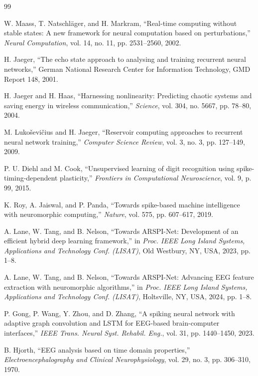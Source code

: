 \documentclass[conference]{IEEEtran}
\begin{document}
\begin{thebibliography}{99}

W. Maass, T. Natschl\"ager, and H. Markram, ``Real-time computing without stable states: A new framework for neural computation based on perturbations,'' \emph{Neural Computation}, vol. 14, no. 11, pp. 2531--2560, 2002.

H. Jaeger, ``The echo state approach to analysing and training recurrent neural networks,'' German National Research Center for Information Technology, GMD Report 148, 2001.

H. Jaeger and H. Haas, ``Harnessing nonlinearity: Predicting chaotic systems and saving energy in wireless communication,'' \emph{Science}, vol. 304, no. 5667, pp. 78--80, 2004.

M. Luko\v{s}evi\v{c}ius and H. Jaeger, ``Reservoir computing approaches to recurrent neural network training,'' \emph{Computer Science Review}, vol. 3, no. 3, pp. 127--149, 2009.

P. U. Diehl and M. Cook, ``Unsupervised learning of digit recognition using spike-timing-dependent plasticity,'' \emph{Frontiers in Computational Neuroscience}, vol. 9, p. 99, 2015.

K. Roy, A. Jaiswal, and P. Panda, ``Towards spike-based machine intelligence with neuromorphic computing,'' \emph{Nature}, vol. 575, pp. 607--617, 2019.

A. Lane, W. Tang, and B. Nelson, ``Towards ARSPI-Net: Development of an efficient hybrid deep learning framework,'' in \emph{Proc. IEEE Long Island Systems, Applications and Technology Conf. (LISAT)}, Old Westbury, NY, USA, 2023, pp. 1--8.

A. Lane, W. Tang, and B. Nelson, ``Towards ARSPI-Net: Advancing EEG feature extraction with neuromorphic algorithms,'' in \emph{Proc. IEEE Long Island Systems, Applications and Technology Conf. (LISAT)}, Holtsville, NY, USA, 2024, pp. 1--8.

P. Gong, P. Wang, Y. Zhou, and D. Zhang, ``A spiking neural network with adaptive graph convolution and LSTM for EEG-based brain-computer interfaces,'' \emph{IEEE Trans. Neural Syst. Rehabil. Eng.}, vol. 31, pp. 1440--1450, 2023.

B. Hjorth, ``EEG analysis based on time domain properties,'' \emph{Electroencephalography and Clinical Neurophysiology}, vol. 29, no. 3, pp. 306--310, 1970.


\end{thebibliography}
\end{document}
